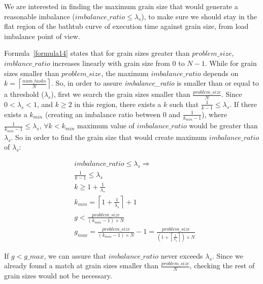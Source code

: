 We are interested in finding the maximum grain size that would generate a reasonable imbalance ($imbalance\_{ratio}\leq{\lambda_s}$), to make sure we should stay in the flat region of the bathtub curve of execution time against grain size, from load imbalance point of view.  

Formula~\ref{formula14} states that for grain sizes greater than $problem\_{size}$, $imblance\_{ratio}$ increases linearly with grain size from $0$ to $N-1$. While for grain sizes smaller than $problem\_{size}$, the maximum $imbalance\_{ratio}$ depends on $k=\left\lceil{\frac{num\_{tasks}}{N}}\right\rceil$. So, in order to assure \emph{imbalance\_{ratio}} is smaller than or equal to a threshold ($\lambda_s$), first we search the grain sizes smaller than $\frac{problem\_{size}}{N}$. Since $0<\lambda_s<1$, and $k\geq2$ in this region, there exists a $k$ such that $\frac{1}{k-1}\leq\lambda_s$.    
If there exists a $k_{min}$ (creating an imbalance ratio between $0$ and $\frac{1}{k_{min}-1}$), where $\frac{1}{k_{min}-1}\leq{\lambda_s}$, $\forall k<k_{min}$ maximum value of $imbalance\_{ratio}$ would be greater than $\lambda_s$. So in order to find the grain size that would create maximum $imbalance\_{ratio}$ of $\lambda_s$:



\begin{equation}\label{formula21}
\begin{aligned}
&imbalance\_{ratio}\leq{{\lambda_s}}\Rightarrow\\
&\frac{1}{k-1}\leq\lambda_s\\
&k\geq{1+\frac{1}{\lambda_s}}\\
&k_{min}=\left\lceil{1+\frac{1}{\lambda_s}}\right\rceil+1\\
&{g}<\frac{problem\_{size}}{(k_{min}-1)\times{N}}\\
&g_{max}=\frac{problem\_{size}}{(k_{min}-1)\times{N}}-1=\frac{problem\_{size}}{(1+\left\lceil{\frac{1}{\lambda_s}}\right\rceil)\times{N}}
\end{aligned}
\end{equation}

If $g<g\_{max}$, we can assure that $imbalance\_{ratio}$ never exceeds $\lambda_s$. Since we already found a match at grain sizes smaller than $\frac{problem\_{size}}{N}$, checking the rest of grain sizes would not be necessary.





